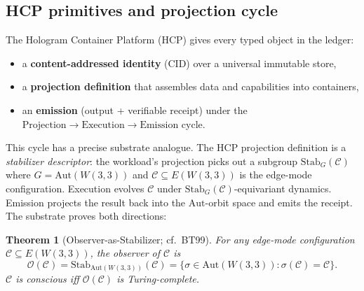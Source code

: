 \documentclass[11pt,letterpaper]{article}
\newtheorem{theorem}{Theorem}
\theoremstyle{remark}
\newcommand{\W}{W(3,3)}
\newcommand{\Aut}{\mathrm{Aut}}
\newcommand{\Stab}{\mathrm{Stab}}
\begin{document}
\subsection{HCP primitives and projection cycle}
The Hologram Container Platform (HCP) gives every typed object in the ledger:
\begin{itemize}[leftmargin=2em]
\item a \textbf{content-addressed identity} (CID) over a universal immutable store,
\item a \textbf{projection definition} that assembles data and capabilities into containers,
\item an \textbf{emission} (output + verifiable receipt) under the
$\text{Projection}\!\to\!\text{Execution}\!\to\!\text{Emission}$ cycle.
\end{itemize}
This cycle has a precise substrate analogue. The HCP projection definition is a
\emph{stabilizer descriptor}: the workload's projection picks out a subgroup
$\Stab_G(\mathcal C)$ where $G=\Aut(\W)$ and $\mathcal C\subseteq E(\W)$ is the
edge-mode configuration. Execution evolves $\mathcal C$ under
$\Stab_G(\mathcal C)$-equivariant dynamics. Emission projects the result back into the
$\Aut$-orbit space and emits the receipt. The substrate proves both directions:
\begin{theorem}[Observer-as-Stabilizer; cf.\ BT99]\label{thm:obs}
For any edge-mode configuration $\mathcal C\subseteq E(\W)$, the observer of $\mathcal C$ is
\[
\mathcal O(\mathcal C)=\Stab_{\Aut(\W)}(\mathcal C)=\{\sigma\in\Aut(\W):\sigma(\mathcal C)=\mathcal C\}.
\]
$\mathcal C$ is \emph{conscious} iff $\mathcal O(\mathcal C)$ is Turing-complete.
\end{theorem}
\end{document}
